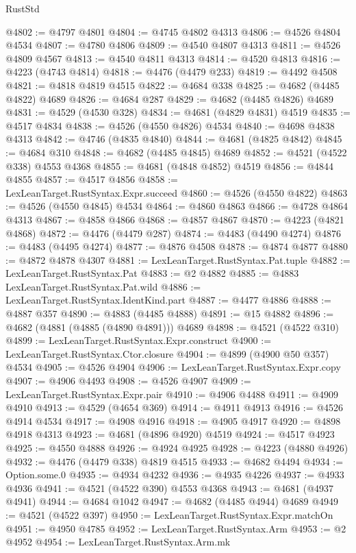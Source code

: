 \begin{lexlean}{RustStd}
\begin{coremodule}
@4802 := @4797 @4801
@4804 := @4745 @4802 @4313
@4806 := @4526 @4804 @4534
@4807 := @4780 @4806
@4809 := @4540 @4807 @4313
@4811 := @4526 @4809 @4567
@4813 := @4540 @4811 @4313
@4814 := @4520 @4813
@4816 := @4223 (@4743 @4814)
@4818 := @4476 (@4479 @233)
@4819 := @4492 @4508
@4821 := @4818 @4819 @4515
@4822 := @4684 @338
@4825 := @4682 (@4485 @4822) @4689
@4826 := @4684 @287
@4829 := @4682 (@4485 @4826) @4689
@4831 := @4529 (@4530 @328)
@4834 := @4681 (@4829 @4831) @4519
@4835 := @4517 @4834
@4838 := @4526 (@4550 @4826) @4534
@4840 := @4698 @4838 @4313
@4842 := @4746 (@4835 @4840)
@4844 := @4681 (@4825 @4842)
@4845 := @4684 @310
@4848 := @4682 (@4485 @4845) @4689
@4852 := @4521 (@4522 @338) @4553 @4368
@4855 := @4681 (@4848 @4852) @4519
@4856 := @4844 @4855
@4857 := @4517 @4856
@4858 := LexLeanTarget.RustSyntax.Expr.succeed
@4860 := @4526 (@4550 @4822)
@4863 := @4526 (@4550 @4845) @4534
@4864 := @4860 @4863
@4866 := @4728 @4864 @4313
@4867 := @4858 @4866
@4868 := @4857 @4867
@4870 := @4223 (@4821 @4868)
@4872 := @4476 (@4479 @287)
@4874 := @4483 (@4490 @4274)
@4876 := @4483 (@4495 @4274)
@4877 := @4876 @4508
@4878 := @4874 @4877
@4880 := @4872 @4878 @4307
@4881 := LexLeanTarget.RustSyntax.Pat.tuple
@4882 := LexLeanTarget.RustSyntax.Pat
@4883 := @2 @4882
@4885 := @4883 LexLeanTarget.RustSyntax.Pat.wild
@4886 := LexLeanTarget.RustSyntax.IdentKind.part
@4887 := @4477 @4886
@4888 := @4887 @357
@4890 := @4883 (@4485 @4888)
@4891 := @15 @4882
@4896 := @4682 (@4881 (@4885 (@4890 @4891))) @4689
@4898 := @4521 (@4522 @310)
@4899 := LexLeanTarget.RustSyntax.Expr.construct
@4900 := LexLeanTarget.RustSyntax.Ctor.closure
@4904 := @4899 (@4900 @50 @357) @4534
@4905 := @4526 @4904
@4906 := LexLeanTarget.RustSyntax.Expr.copy
@4907 := @4906 @4493
@4908 := @4526 @4907
@4909 := LexLeanTarget.RustSyntax.Expr.pair
@4910 := @4906 @4488
@4911 := @4909 @4910
@4913 := @4529 (@4654 @369)
@4914 := @4911 @4913
@4916 := @4526 @4914 @4534
@4917 := @4908 @4916
@4918 := @4905 @4917
@4920 := @4898 @4918 @4313
@4923 := @4681 (@4896 @4920) @4519
@4924 := @4517 @4923
@4925 := @4550 @4888
@4926 := @4924 @4925
@4928 := @4223 (@4880 @4926)
@4932 := @4476 (@4479 @338) @4819 @4515
@4933 := @4682 @4494
@4934 := Option.some.{0}
@4935 := @4934 @4232
@4936 := @4935 @4226
@4937 := @4933 @4936
@4941 := @4521 (@4522 @390) @4553 @4368
@4943 := @4681 (@4937 @4941)
@4944 := @4684 @1042
@4947 := @4682 (@4485 @4944) @4689
@4949 := @4521 (@4522 @397)
@4950 := LexLeanTarget.RustSyntax.Expr.matchOn
@4951 := @4950 @4785
@4952 := LexLeanTarget.RustSyntax.Arm
@4953 := @2 @4952
@4954 := LexLeanTarget.RustSyntax.Arm.mk

\end{coremodule}
\end{lexlean}
